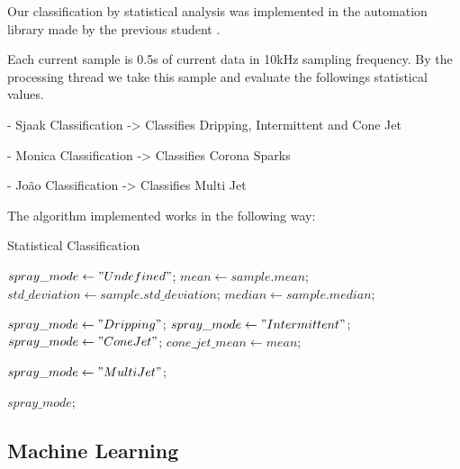  Our classification by statistical analysis was implemented in the automation library made by the previous student \cite{Monica}.

 Each current sample is 0.5s of current data in 10kHz sampling frequency.
 By the processing thread we take this sample and evaluate the followings statistical values.
        
        - Sjaak Classification -> Classifies Dripping, Intermittent and Cone Jet
        
        - Monica Classification -> Classifies Corona Sparks

        - João Classification -> Classifies Multi Jet

	The algorithm implemented works in the following way:
	\begin{algorithm}
        \caption{Statistical Classification}\label{alg:statistical_class}
        \begin{algorithmic}

            \State $spray\_mode \gets "Undefined"$;
            \State $mean \gets sample.mean$; 
            \State $std\_deviation \gets sample.std\_deviation$;
            \State $median \gets sample.median$;
            
                \State $spray\_mode \gets "Dripping"$;
                \State $spray\_ mode \gets "Intermittent"$;
                \State $spray\_ mode \gets "Cone Jet"$;
                \State $cone\_jet\_mean \gets mean$;
            \EndIf

            \EndIf

                    \State $spray\_ mode \gets "Multi Jet"$;
                \EndIf
            \EndIf

            \Return $spray\_ mode$;
        \EndFunction
        \end{algorithmic}
    \end{algorithm}


\subsection{Machine Learning}


